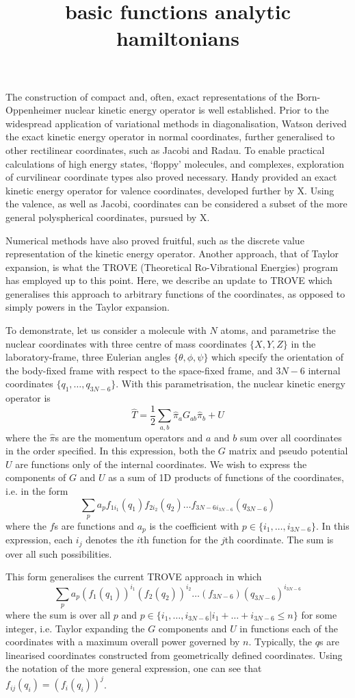 \documentclass{article}
\title{basic functions analytic hamiltonians}
\begin{document}
The construction of compact and, often, exact representations of the Born-Oppenheimer nuclear kinetic energy operator is well established. Prior to the widespread application of variational methods in diagonalisation, Watson derived the exact kinetic energy operator in normal coordinates, further generalised to other rectilinear coordinates, such as Jacobi and Radau. To enable practical calculations of high energy states, `floppy' molecules, and complexes, exploration of curvilinear coordinate types also proved necessary. Handy provided an exact kinetic energy operator for valence coordinates, developed further by X.  Using the valence, as well as Jacobi, coordinates can be considered a subset of the more general polyspherical coordinates, pursued by X. 

Numerical methods have also proved fruitful, such as the discrete value representation of the kinetic energy operator. Another approach, that of Taylor expansion, is what the TROVE (Theoretical Ro-Vibrational Energies) program has employed up to this point. Here, we describe an update to TROVE which generalises this approach to arbitrary functions of the coordinates, as opposed to simply powers in the Taylor expansion. 

To demonstrate, let us consider a molecule with $N$ atoms, and parametrise the nuclear coordinates with three centre of mass coordinates $\{X,Y,Z\}$ in the laboratory-frame, three Eulerian angles $\{\theta, \phi, \psi\}$ which specify the orientation of the body-fixed frame with respect to the space-fixed frame, and $3N-6$ internal coordinates $\{q_1, \ldots, q_{3N-6}\}$. With this parametrisation, the nuclear kinetic energy operator is  
\[
\hat{T}= \dfrac12 \sum_{a,b}\hat{\pi}_a G_{ab}\hat{\pi}_b + U
\]
where the $\hat{\pi}$s are the momentum operators and $a$ and $b$ sum over all coordinates in the order specified. In this expression, both the $G$ matrix and pseudo potential $U$ are functions only of the internal coordinates. We wish to express the components of $G$ and $U$ as a sum of 1D products of functions of the coordinates, i.e. in the form
\[
\sum_{p} a_p f_{1i_1}(q_1)f_{2i_2}(q_2)\ldots f_{3N-6 i_{3N-6}}(q_{3N-6})
\]
where the $f$s are functions and $a_p$ is the coefficient with $p\in \{i_1, \ldots, i_{3N-6}\}$. In this expression, each $i_j$ denotes the $i$th function for the $j$th coordinate. The sum is over all such possibilities.
 
This form generalises the current TROVE approach in which 
\[
\sum_{p} a_p (f_1(q_1))^{i_1} (f_2(q_2))^{i_2} \ldots (f_{3N-6})(q_{3N-6})^{i_{3N-6}}
\]
where the sum is over all $p$ and $p \in \{ i_1, \dots, i_{3N-6} | i_1 + \ldots + i_{3N-6} \leq n\}$ for some integer, i.e. Taylor expanding the $G$ components and $U$ in functions each of the coordinates with a maximum overall power governed by $n$. Typically, the $q$s are linearised coordinates constructed from geometrically defined coordinates. Using the notation of the more general expression, one can see that $f_{ij}(q_i) = (f_{i}(q_i))^j$. 
\end{document}
